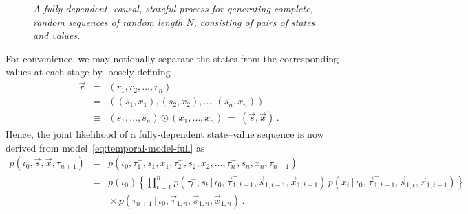 \documentclass[a4paper]{article}
\newcommand{\vr}{\vec{r}}
\newcommand{\tm}{\tau^{-}}
\newcommand{\vs}{\vec{s}}
\newcommand{\vx}{\vec{x}}
\begin{document}
\begin{figure}[hbt]
\caption{\em A fully-dependent, causal, stateful process for generating complete, random sequences of random length $N$, consisting of pairs of states and values.}
\label{fig:stateful-full}
\end{figure}
For convenience, we may notionally separate the states from the corresponding values at each stage by loosely defining
\begin{eqnarray}
\vr & = & (r_1,r_2,\ldots,r_n)
\nonumber\\& = & 
((s_1,x_1),(s_2,x_2),\ldots,(s_n,x_n))
\nonumber\\& \equiv & 
(s_1,\ldots,s_n)\odot (x_1,\ldots,x_n)~=~(\vs,\vx)\,.
\end{eqnarray}
Hence, the joint likelihood of a fully-dependent state--value sequence is now derived from model~\eqref{eq:temporal-model-full} as
\begin{eqnarray}
p(\iota_0,\vs,\vx,\tau_{n+1}) & = &
p(\iota_0,\tm_1,s_1,x_1,\tm_2,s_2,x_2,\ldots,\tm_n,s_n,x_n,\tau_{n+1})
\nonumber\\
& = &
p(\iota_0)
\left\{\prod_{t=1}^{n}p(\tm_t,s_t\,|\,\iota_0,\vec{\tau}^-_{1,t-1},\vs_{1,t-1},\vx_{1,t-1})\,p(x_t\,|\,\iota_0,\vec{\tau}^-_{1,t-1},\vs_{1,t},\vx_{1,t-1})\right\}
\nonumber\\&&{}\times
 p(\tau_{n+1}\,|\,\iota_0,\vec{\tau}^-_{1,n},\vs_{1,n},\vx_{1,n})
\,.
\label{eq:stateful-model-full}
\end{eqnarray}
\end{document}
